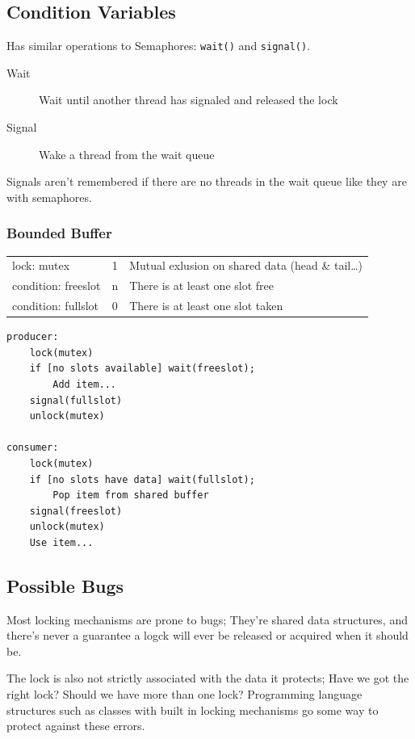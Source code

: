 \documentclass{article}
\begin{document}
\subsection{Condition Variables}

Has similar operations to Semaphores: \texttt{wait()} and \texttt{signal()}.

\begin{description}
  \item[Wait] Wait until another thread has signaled and released the lock
  \item[Signal] Wake a thread from the wait queue
\end{description}

Signals aren't remembered if there are no threads in the wait queue like they are with semaphores.

\subsubsection{Bounded Buffer}


\begin{tabular}{l | c | l }
lock:      mutex    & 1 & Mutual exlusion on shared data (head \& tail\ldots{})\\
condition: freeslot & n & There is at least one slot free\\
condition: fullslot & 0 & There is at least one slot taken
\end{tabular}

\begin{verbatim}
producer:
    lock(mutex)
    if [no slots available] wait(freeslot);
        Add item...
    signal(fullslot)
    unlock(mutex)

consumer:
    lock(mutex)
    if [no slots have data] wait(fullslot);
        Pop item from shared buffer
    signal(freeslot)
    unlock(mutex)
    Use item...
\end{verbatim}

\subsection{Possible Bugs}

Most locking mechanisms are prone to bugs; They're shared data structures, and there's never a
guarantee a logck will ever be released or acquired when it should be.

The lock is also not strictly associated with the data it protects; Have we got the right lock? 
Should we have more than one lock? Programming language structures
such as classes with built in locking mechanisms go some way to protect against these errors.
\end{document}

